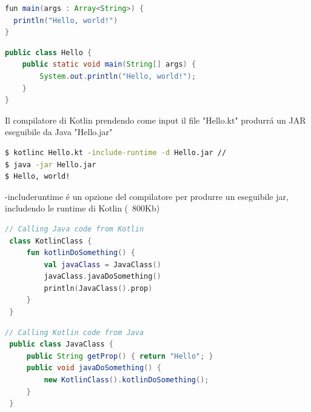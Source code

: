 \begin{lstlisting}[language=java,caption={Hello.kt in Kotlin}]
fun main(args : Array<String>) {
  println("Hello, world!")
}
\end{lstlisting}

\begin{lstlisting}[language=java,caption={Hello.java in Java}]
public class Hello {
    public static void main(String[] args) {
        System.out.println("Hello, world!");
    }
}
\end{lstlisting}

Il compilatore di Kotlin prendendo come input il file "Hello.kt" produrr\'a un JAR eseguibile da Java "Hello.jar"


\begin{lstlisting}[language=bash,caption={Compilatore kotlin}]
$ kotlinc Hello.kt -include-runtime -d Hello.jar //
$ java -jar Hello.jar
$ Hello, world!
\end{lstlisting}

 -includeruntime \'e un opzione del compilatore per produrre un eseguibile jar, includendo le runtime di Kotlin (~800Kb)


\begin{lstlisting}[language=Kotlin,caption={da Java a Kotlin}]
 // Calling Java code from Kotlin
 class KotlinClass {
     fun kotlinDoSomething() {
         val javaClass = JavaClass()
         javaClass.javaDoSomething()
         println(JavaClass().prop)
     }
 }
 \end{lstlisting}

 \begin{lstlisting}[language=java,caption={da Kotlin a Java }]
 // Calling Kotlin code from Java
 public class JavaClass {
     public String getProp() { return "Hello"; }
     public void javaDoSomething() {
         new KotlinClass().kotlinDoSomething();
     }
 }
 \end{lstlisting}

